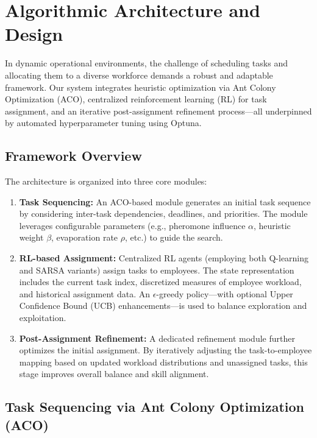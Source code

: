 \documentclass[conference]{IEEEtran}
\begin{document}
	

	\section{Algorithmic Architecture and Design}
	
	In dynamic operational environments, the challenge of scheduling tasks and allocating them to a diverse workforce demands a robust and adaptable framework. Our system integrates heuristic optimization via Ant Colony Optimization (ACO), centralized reinforcement learning (RL) for task assignment, and an iterative post-assignment refinement process—all underpinned by automated hyperparameter tuning using Optuna.
	
	\subsection{Framework Overview}
	
	The architecture is organized into three core modules:
	\begin{enumerate}
		\item \textbf{Task Sequencing:} An ACO-based module generates an initial task sequence by considering inter-task dependencies, deadlines, and priorities. The module leverages configurable parameters (e.g., pheromone influence $\alpha$, heuristic weight $\beta$, evaporation rate $\rho$, etc.) to guide the search.
		\item \textbf{RL-based Assignment:} Centralized RL agents (employing both Q-learning and SARSA variants) assign tasks to employees. The state representation includes the current task index, discretized measures of employee workload, and historical assignment data. An $\epsilon$-greedy policy—with optional Upper Confidence Bound (UCB) enhancements—is used to balance exploration and exploitation.
		\item \textbf{Post-Assignment Refinement:} A dedicated refinement module further optimizes the initial assignment. By iteratively adjusting the task-to-employee mapping based on updated workload distributions and unassigned tasks, this stage improves overall balance and skill alignment.
	\end{enumerate}
	
	\subsection{Task Sequencing via Ant Colony Optimization (ACO)}
	
\end{document}
